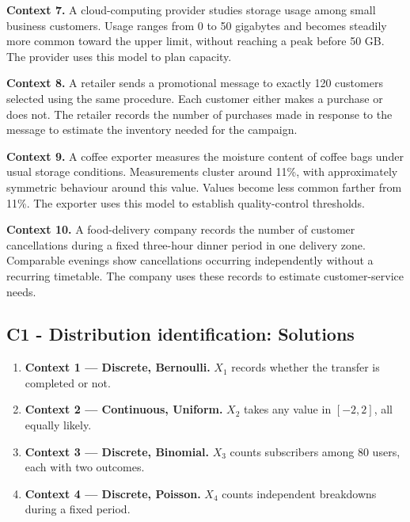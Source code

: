 {		\textbf{Context 7.} A cloud-computing provider studies storage usage
		among small business customers. Usage ranges from 0 to 50 gigabytes
		and becomes steadily more common toward the upper limit, without
		reaching a peak before 50 GB. The provider uses this model to plan
		capacity.
		
		\textbf{Context 8.} A retailer sends a promotional message to exactly
		120 customers selected using the same procedure. Each customer either
		makes a purchase or does not. The retailer records the number of
		purchases made in response to the message to estimate the inventory
		needed for the campaign.
		
		\textbf{Context 9.} A coffee exporter measures the moisture content
		of coffee bags under usual storage conditions. Measurements cluster
		around 11\%, with approximately symmetric behaviour around
		this value. Values become less common farther from 11\%. The exporter
		uses this model to establish quality-control thresholds.
		
		\textbf{Context 10.} A food-delivery company records the number of
		customer cancellations during a fixed three-hour dinner period in one
		delivery zone. Comparable evenings show cancellations occurring
		independently without a recurring timetable. The company uses these
		records to estimate customer-service needs.
		
		
		\label{subsec:identifying-probability-distributions-c1-solution}
		\subsection*{C1 - Distribution identification: Solutions }
		
		\begin{enumerate}
			
			\item \textbf{Context 1 — Discrete, Bernoulli.}
			\(X_1\) records whether the transfer is completed or not.
			
			\item \textbf{Context 2 — Continuous, Uniform.}
			\(X_2\) takes any value in \([-2,2]\), all equally likely.
			
			\item \textbf{Context 3 — Discrete, Binomial.}
			\(X_3\) counts subscribers among 80 users, each with two outcomes.
			
			\item \textbf{Context 4 — Discrete, Poisson.}
			\(X_4\) counts independent breakdowns during a fixed period.
			

\end{enumerate}}
